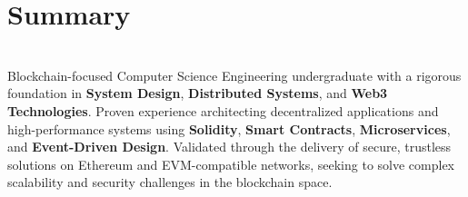 \MainDivider
\section*{Summary}
\BigDivider\\
\noindent
Blockchain-focused Computer Science Engineering undergraduate with a rigorous foundation in \textbf{System Design}, \textbf{Distributed Systems}, and \textbf{Web3 Technologies}. Proven experience architecting decentralized applications and high-performance systems using \textbf{Solidity}, \textbf{Smart Contracts}, \textbf{Microservices}, and \textbf{Event-Driven Design}. Validated through the delivery of secure, trustless solutions on Ethereum and EVM-compatible networks, seeking to solve complex scalability and security challenges in the blockchain space.
